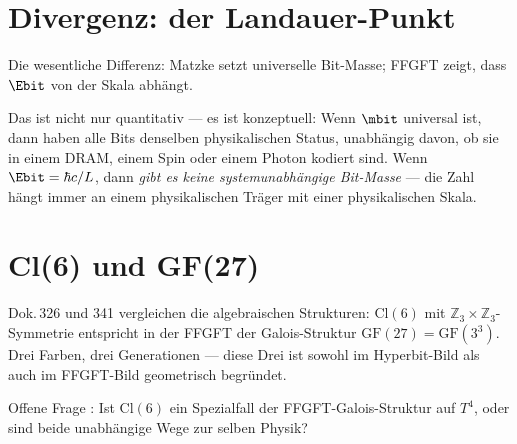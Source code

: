\section{Divergenz: der Landauer-Punkt}

Die wesentliche Differenz: Matzke setzt universelle Bit-Masse;
FFGFT zeigt, dass $\Ebit$ von der Skala abhängt. 

Das ist nicht nur quantitativ --- es ist konzeptuell: Wenn $\mbit$ universal
ist, dann haben alle Bits denselben physikalischen Status, unabhängig davon,
ob sie in einem DRAM, einem Spin oder einem Photon kodiert sind.
Wenn $\Ebit = \hbar c/L$, dann \emph{gibt es keine systemunabhängige
Bit-Masse} --- die Zahl hängt immer an einem physikalischen Träger
mit einer physikalischen Skala.

\section{Cl(6) und GF(27)}

Dok.\,326 und 341 vergleichen die algebraischen Strukturen:
$\mathrm{Cl}(6)$ mit $\mathbb{Z}_3 \times \mathbb{Z}_3$-Symmetrie entspricht
in der FFGFT der Galois-Struktur $\mathrm{GF}(27) = \mathrm{GF}(3^3)$.
Drei Farben, drei Generationen --- diese Drei ist sowohl im Hyperbit-Bild
als auch im FFGFT-Bild geometrisch begründet. 

Offene Frage : Ist $\mathrm{Cl}(6)$ ein Spezialfall der
FFGFT-Galois-Struktur auf $T^4$, oder sind beide unabhängige Wege zur
selben Physik?
